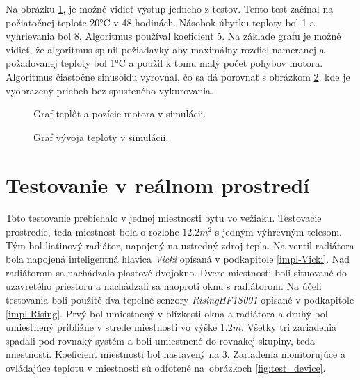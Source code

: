 Na obrázku \ref{fig:simGraph}, je možné vidieť výstup jedneho z testov. 
Tento test začínal na počiatočnej teplote 20°C v 48 hodinách. 
Násobok úbytku teploty bol 1 a vyhrievania bol 8. 
Algoritmus používal koeficient 5. 
Na základe grafu je možné vidieť, že algoritmus splnil požiadavky aby maximálny rozdiel nameranej a požadovanej teploty bol 1°C a použil k tomu malý počet pohybov motora. 
Algoritmus čiastočne sinusoidu vyrovnal, čo sa dá porovnať s obrázkom \ref{fig:simGraphNoHeating}, kde je vyobrazený priebeh bez spusteného vykurovania.

\begin{figure}[H]
    \centering
    
    \caption{Graf teplôt a pozície motora v simulácii.}
    \label{fig:simGraph}
\end{figure}

\begin{figure}[H]
    \centering
    
    \caption{Graf vývoja teploty v simulácii.}
    \label{fig:simGraphNoHeating}
\end{figure}



\section{Testovanie v reálnom prostredí}\label{test-real}
Toto testovanie prebiehalo v jednej miestnosti bytu vo vežiaku. 
Testovacie prostredie, teda miestnosť bola o rozlohe $12.2 m^2$ s jedným výhrevným telesom. 
Tým bol liatinový radiátor, napojený na ustredný zdroj tepla. 
Na ventil radiátora bola napojená inteligentná hlavica \emph{Vicki} opísaná v podkapitole \ref{impl-Vicki}. 
Nad radiátorom sa nachádzalo plastové dvojokno. 
Dvere miestnosti boli situované do uzavretého priestoru a nachádzali sa naoproti oknu s radiátorom. 
Na účeli testovania boli použité dva tepelné senzory \emph{RisingHF1S001} opísané v podkapitole \ref{impl-Rising}. 
Prvý bol umiestnený v blízkosti okna a radiátora a druhý bol umiestnený približne v strede miestnosti vo výške $1.2 m$.
Všetky tri zariadenia spadali pod rovnaký systém a boli umiestnené do rovnakej skupiny, teda miestnosti.
Koeficient miestnosti bol nastavený na 3.
Zariadenia monitorujúce a ovládajúce teplotu v miestnosti sú odfotené na~obrázkoch \ref{fig:test_device}.

